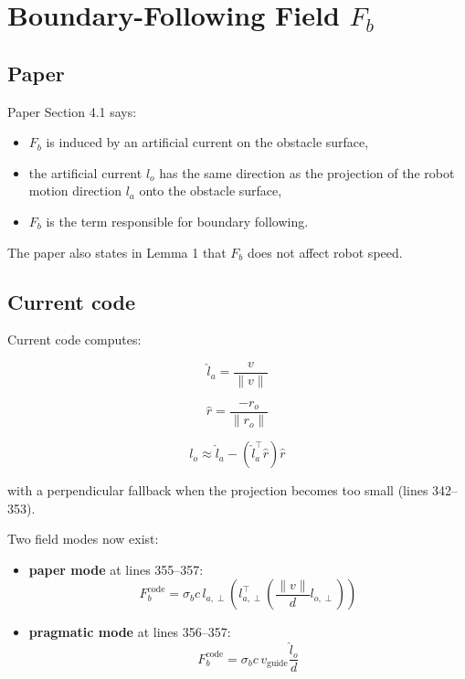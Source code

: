 \documentclass[11pt]{article}
\begin{document}
\section*{Boundary-Following Field \(F_b\)}

\subsection*{Paper}

Paper Section 4.1 says:

\begin{itemize}[leftmargin=*]
  \item \(F_b\) is induced by an artificial current on the obstacle surface,
  \item the artificial current \(l_o\) has the same direction as the
  projection of the robot motion direction \(l_a\) onto the obstacle surface,
  \item \(F_b\) is the term responsible for boundary following.
\end{itemize}

The paper also states in Lemma 1 that \(F_b\) does not affect robot speed.

\subsection*{Current code}

Current code computes:

\begin{equation}
\hat{l}_a = \frac{v}{\lVert v \rVert}
\end{equation}

\begin{equation}
\hat{r} = \frac{-r_o}{\lVert r_o \rVert}
\end{equation}

\begin{equation}
l_o \approx \hat{l}_a - (\hat{l}_a^{\top}\hat{r})\hat{r}
\end{equation}

with a perpendicular fallback when the projection becomes too small
(lines 342--353).

Two field modes now exist:

\begin{itemize}[leftmargin=*]
  \item \textbf{paper mode} at lines 355--357:
  \begin{equation}
  F_b^{\text{code}} =
  \sigma_b c\, l_{a,\perp}\left(l_{a,\perp}^{\top}
  \left(\frac{\lVert v \rVert}{d} l_{o,\perp}\right)\right)
  \end{equation}
  \item \textbf{pragmatic mode} at lines 356--357:
  \begin{equation}
  F_b^{\text{code}} =
  \sigma_b c\, v_{\text{guide}} \frac{\hat{l}_o}{d}
  \end{equation}
\end{itemize}
\end{document}
